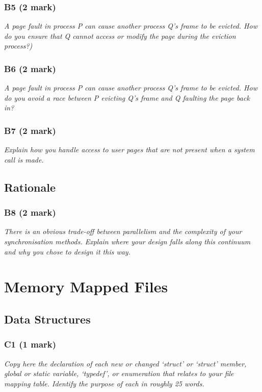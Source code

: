\documentclass{report}
\newcommand{\question}[1]{\textit{#1} \ }
\begin{document}
			\subsubsection*{B5 (2 mark)}
				\question{A page fault in process P can cause another process Q's frame to
				be evicted. How do you ensure that Q cannot access or modify the page 
				during the eviction process?)}

			\subsubsection*{B6 (2 mark)}
				\question{A page fault in process P can cause another process Q's frame
				to be evicted. How do you avoid a race between P evicting Q's frame and 
				Q faulting the page back in?}

			\subsubsection*{B7 (2 mark)}
				\question{Explain how you handle access to user pages that are not 
				present when a system call is made.}
			
		\subsection*{Rationale}
			\subsubsection*{B8 (2 mark)}
				\question{There is an obvious trade-off between parallelism and the 
				complexity of your synchronisation methods. Explain where your design 
				falls along this continuum and why you chose to design it this way.}

	\section*{Memory Mapped Files}
		\subsection*{Data Structures}
			\subsubsection*{C1 (1 mark)}
				\question{Copy here the declaration of each new or changed `struct' or 
				`struct' member, global or static variable, `typedef', or 
				enumeration that relates to your file mapping table. Identify 
				the purpose of each in roughly 25 words.}
				
\end{document}
